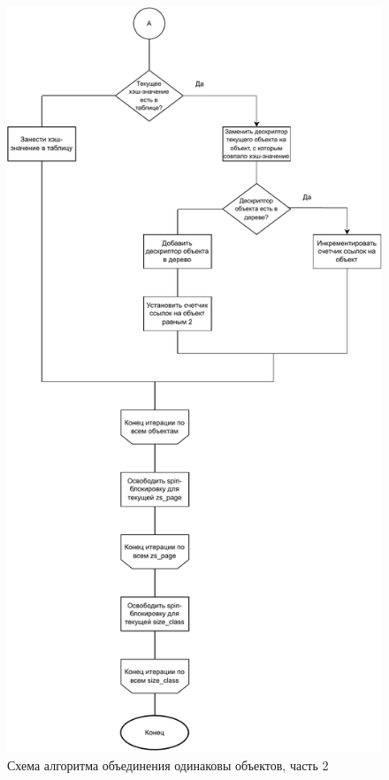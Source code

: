 \begin{figure}[h]
	\centering
	\includegraphics[scale=0.7]{img/scheme-1.pdf}
	\caption{Схема алгоритма объединения одинаковы объектов, часть 2}
	\label{fig:scheme-1}
\end{figure}

\pagebreak
